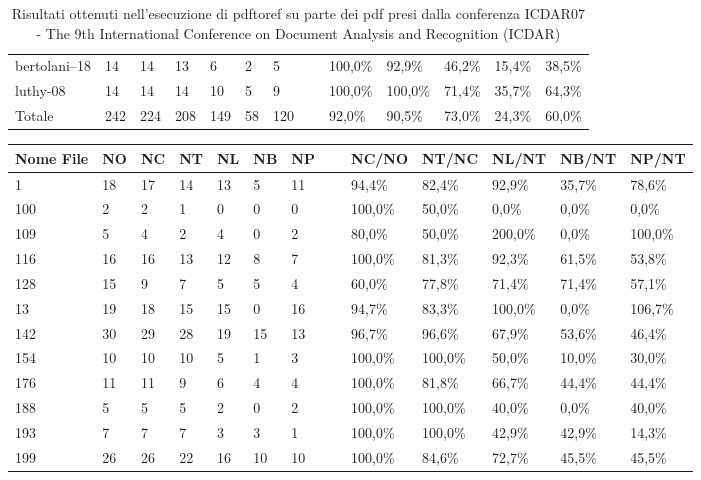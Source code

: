 \begin{table}
\begin{center}
\begin{tabular}{|l|l|l|l|l|l|l|l|l|l|l|l|l|}
bertolani--18 & 14 & 14 & 13 & 6 & 2 & 5 & ~ & 100,0\% & 92,9\% & 46,2\% & 15,4\% & 38,5\%\\
luthy-08 & 14 & 14 & 14 & 10 & 5 & 9 & ~ & 100,0\% & 100,0\% & 71,4\% & 35,7\% & 64,3\%\\ \hline
Totale & 242 & 224 & 208 & 149 & 58 & 120 & ~ & 92,0\% & 90,5\% & 73,0\% & 24,3\% & 60,0\%\\ \hline
	\end{tabular}
	\tiny{\caption{Risultati ottenuti nell'esecuzione di pdftoref su parte dei pdf presi dalla conferenza ICDAR07 - The 9th International Conference on Document Analysis and Recognition (ICDAR) }}
	\end{center}
	\end{table}

	\begin{table}\label{tab:icdar}
	\begin{center}
	\begin{tabular}{|l|l|l|l|l|l|l|l|l|l|l|l|l|} \hline
Nome File & NO & NC & NT & NL & NB & NP & ~ & NC/NO & NT/NC & NL/NT & NB/NT & NP/NT \\ \hline
1 & 18 & 17 & 14 & 13 & 5 & 11 & ~ & 94,4\% & 82,4\% & 92,9\% & 35,7\% & 78,6\%\\
100 & 2 & 2 & 1 & 0 & 0 & 0 & ~ & 100,0\% & 50,0\% & 0,0\% & 0,0\% & 0,0\%\\
109 & 5 & 4 & 2 & 4 & 0 & 2 & ~ & 80,0\% & 50,0\% & 200,0\% & 0,0\% & 100,0\%\\
116 & 16 & 16 & 13 & 12 & 8 & 7 & ~ & 100,0\% & 81,3\% & 92,3\% & 61,5\% & 53,8\%\\
128 & 15 & 9 & 7 & 5 & 5 & 4 & ~ & 60,0\% & 77,8\% & 71,4\% & 71,4\% & 57,1\%\\
13 & 19 & 18 & 15 & 15 & 0 & 16 & ~ & 94,7\% & 83,3\% & 100,0\% & 0,0\% & 106,7\%\\
142 & 30 & 29 & 28 & 19 & 15 & 13 & ~ & 96,7\% & 96,6\% & 67,9\% & 53,6\% & 46,4\%\\
154 & 10 & 10 & 10 & 5 & 1 & 3 & ~ & 100,0\% & 100,0\% & 50,0\% & 10,0\% & 30,0\%\\
176 & 11 & 11 & 9 & 6 & 4 & 4 & ~ & 100,0\% & 81,8\% & 66,7\% & 44,4\% & 44,4\%\\
188 & 5 & 5 & 5 & 2 & 0 & 2 & ~ & 100,0\% & 100,0\% & 40,0\% & 0,0\% & 40,0\%\\
193 & 7 & 7 & 7 & 3 & 3 & 1 & ~ & 100,0\% & 100,0\% & 42,9\% & 42,9\% & 14,3\%\\
199 & 26 & 26 & 22 & 16 & 10 & 10 & ~ & 100,0\% & 84,6\% & 72,7\% & 45,5\% & 45,5\%\\

\end{tabular}
\end{center}
\end{table}
